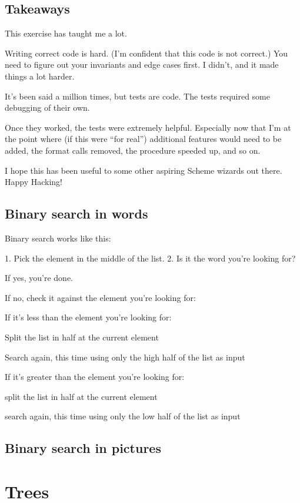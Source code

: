 \documentclass[12pt,openright,draft]{book}
\begin{document}
\section{Takeaways}

This exercise has taught me a lot. 

Writing correct code is hard. (I'm confident that this code is not correct.) You need to figure out your invariants and edge cases first. I didn't, and it made things a lot harder. 

It's been said a million times, but tests are code. The tests required some debugging of their own. 

Once they worked, the tests were extremely helpful. Especially now
that I'm at the point where (if this were ``for real'') additional
features would need to be added, the format calls removed, the
procedure speeded up, and so on.

I hope this has been useful to some other aspiring Scheme wizards out there. Happy Hacking!    

\section{Binary search in words}

Binary search works like this:

1. Pick the element in the middle of the list.
2. Is it the word you're looking for?

If yes, you're done.

If no, check it against the element you're looking for:

If it's less than the element you're looking for:

Split the list in half at the current element

Search again, this time using only the high half of the list as
input

If it's greater than the element you're looking for:

split the list in half at the current element

search again, this time using only the low half of the list as
input

\section{Binary search in pictures}


\chapter{Trees}
\end{document}

